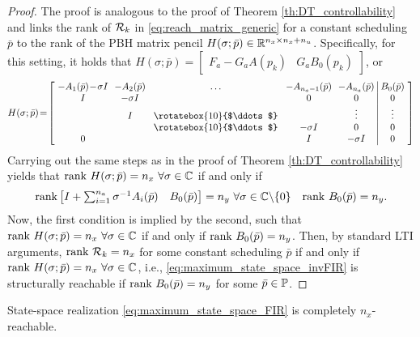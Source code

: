 \begin{proof}
    The proof is analogous to the proof of Theorem \ref{th:DT_controllability} and links the rank of $\mathcal{R}_k$ in \eqref{eq:reach_matrix_generic} for a constant scheduling $\bar{p}$ to the rank of the PBH matrix pencil $H(\sigma; \bar{p}) \in \mathbb{R}^{n_x \times n_x + n_u}$. Specifically, for this setting, it holds that $H(\sigma;\bar{p}) = \left[\begin{array}{c|c} F_a - G_a A(p_k) & G_a B_0 (p_k) \end{array}\right]$, or 
    \begin{equation}
        H(\sigma;\bar{p}) \! = \! \left[
        \begin{array}{ccccc|c}
        \!-A_1(\bar{p}) \!-\!\sigma I \! & \! -A_2(\bar{p}) \! & \! \hdots \! & \! -A_{n_a-1}(\bar{p}) \! & \! -A_{n_a}(\bar{p}) \! &  \! B_0(\bar{p}) \! \\
        I & -\sigma I  & & 0 & 0 & 0 \\
         & I & \raisebox{0pt}{\rotatebox{10}{$\ddots$}} & & \vdots & \vdots \\
        & & \raisebox{0pt}{\rotatebox{10}{$\ddots$}}  & -\sigma I & 0 & 0 \\
        0 &  & & I & -\sigma I & 0 
        \end{array}
        \right]
    \end{equation}
    Carrying out the same steps as in the proof of Theorem \ref{th:DT_controllability} yields that $\rank\ H(\sigma; \bar{p}) = n_x \ \forall \sigma\in\Cee$ if and only if
    \begin{align}
        \textrm{rank} \begin{bmatrix} I + \sum_{i=1}^{n_a} \sigma^{-1} A_i(\bar{p}) & B_0(\bar{p}) \end{bmatrix} = n_y \ \forall \sigma \in \mathbb{C} \backslash \{0\} & & \textnormal{\textrm{rank}}\ B_0(\bar{p}) = n_y.
    \end{align}
    Now, the first condition is implied by the second, such that $\rank\ H(\sigma; \bar{p}) = n_x \ \forall \sigma\in\Cee$ if and only if $\rank\ B_0(\bar{p}) = n_y$. Then, by standard LTI arguments, $\textrm{rank}\ \mathcal{R}_k = n_x$ for some constant scheduling $\bar{p}$ if and only if $\rank\ H(\sigma; \bar{p}) = n_x \ \forall \sigma\in\Cee$, i.e., \eqref{eq:maximum_state_space_invFIR} is structurally reachable if $\rank\ B_0(\bar{p}) = n_y$ for some $\bar{p}\in\mathbb{P}$.
\end{proof}
\begin{corollary}\label{cor:reachability_FIR}
    State-space realization \eqref{eq:maximum_state_space_FIR} is completely $n_x$-reachable.
\end{corollary}
